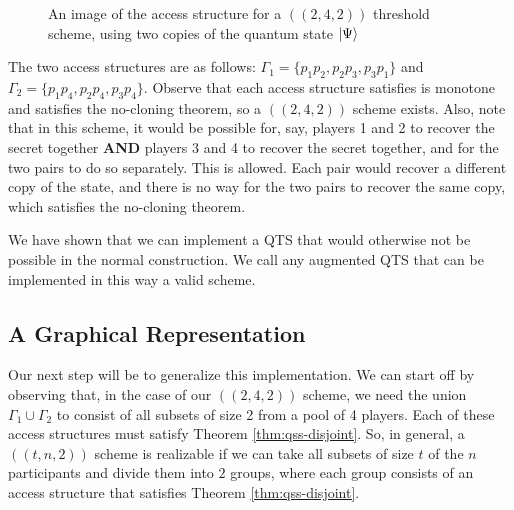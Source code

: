 \begin{figure}[H]
	\begin{center}
	\end{center}
	\caption{An image of the access structure for a $((2,4,2))$ threshold scheme, using two copies of the quantum state $\ket{\Psi}$}
	\label{fig:2-4-2}
\end{figure}

The two access structures are as follows: $\Gamma_1 = \{p_1p_2,p_2p_3,p_3p_1\}$ and $\Gamma_2 = \{p_1p_4,p_2p_4,p_3p_4\}$. Observe that each access structure satisfies is monotone and satisfies the no-cloning theorem, so a $((2,4,2))$ scheme exists. Also, note that in this scheme, it would be possible for, say, players 1 and 2 to recover the secret together \textbf{AND} players 3 and 4 to recover the secret together, and for the two pairs to do so separately. This is allowed. Each pair would recover a different copy of the state, and there is no way for the two pairs to recover the same copy, which satisfies the no-cloning theorem.

We have shown that we can implement a QTS that would otherwise not be possible in the normal construction. We call any augmented QTS that can be implemented in this way a valid scheme.

\subsection{A Graphical Representation}
\label{ssec:graphical-rep}

Our next step will be to generalize this implementation. We can start off by observing that, in the case of our $((2,4,2))$ scheme, we need the union $\Gamma_1 \cup \Gamma_2$ to consist of all subsets of size 2 from a pool of 4 players. Each of these access structures must satisfy Theorem \ref{thm:qss-disjoint}. So, in general, a $((t,n,2))$ scheme is realizable if we can take all subsets of size $t$ of the $n$ participants and divide them into $2$ groups, where each group consists of an access structure that satisfies Theorem \ref{thm:qss-disjoint}. 

